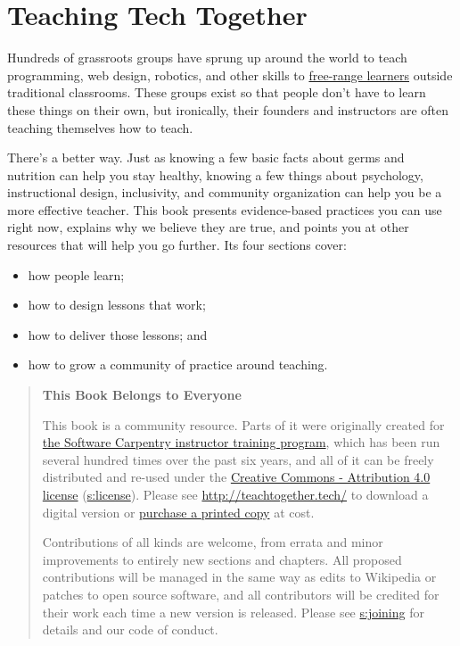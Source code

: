 
\chapter{Teaching Tech Together}\label{teaching-tech-together}

Hundreds of grassroots groups have sprung up around the world to teach
programming, web design, robotics, and other skills to \protect\hyperlink{g:free-range-learner}{free-range
learners} outside traditional classrooms. These
groups exist so that people don't have to learn these things on their
own, but ironically, their founders and instructors are often teaching
themselves how to teach.

There's a better way. Just as knowing a few basic facts about germs
and nutrition can help you stay healthy, knowing a few things about
psychology, instructional design, inclusivity, and community
organization can help you be a more effective teacher. This book
presents evidence-based practices you can use right now, explains why
we believe they are true, and points you at other resources that will
help you go further. Its four sections cover:

\begin{itemize}
\tightlist
\item
  how people learn;
\item
  how to design lessons that work;
\item
  how to deliver those lessons; and
\item
  how to grow a community of practice around teaching.
\end{itemize}

\begin{quote}\setlength{\parindent}{0pt}
\textbf{This Book Belongs to Everyone}

This book is a community resource. Parts of it were originally
created for \href{http://carpentries.github.io/instructor-training/}{the Software Carpentry instructor training
program}, which has been run several
hundred times over the past six years, and all of it can be freely
distributed and re-used under the \href{https://creativecommons.org/licenses/by/4.0/}{Creative Commons - Attribution 4.0
license} (\protect\hyperlink{APPENDIX}{s:license}). Please see
\url{http://teachtogether.tech/} to download a digital version
or \href{http://www.lulu.com/commerce/index.php?fBuyContent=23123539}{purchase a printed copy} at cost.

Contributions of all kinds are welcome, from errata and minor
improvements to entirely new sections and chapters. All proposed
contributions will be managed in the same way as edits to Wikipedia
or patches to open source software, and all contributors will be
credited for their work each time a new version is released. Please
see \protect\hyperlink{APPENDIX}{s:joining} for details and our code of conduct.
\end{quote}

